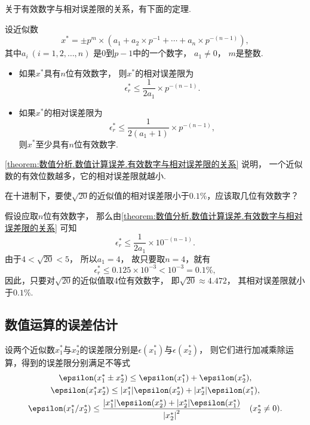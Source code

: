 关于有效数字与相对误差限的关系，有下面的定理.
\begin{theorem}\label{theorem:数值分析.数值计算误差.有效数字与相对误差限的关系}
设近似数\begin{equation*}
	x^*
	= \pm p^m \times (
		a_1
		+ a_2 \times p^{-1}
		+ \dotsb
		+ a_n \times p^{-(n-1)}
	),
\end{equation*}
其中\(a_i\ (i=1,2,\dotsc,n)\)
是\(0\)到\(p-1\)中的一个数字，
\(a_1\neq0\)，
\(m\)是整数.
\begin{itemize}
	\item 如果\(x^*\)具有\(n\)位有效数字，
	则\(x^*\)的相对误差限为\begin{equation}
		\epsilon^*_r
		\leq \frac1{2 a_1} \times p^{-(n-1)}.
	\end{equation}

	\item 如果\(x^*\)的相对误差限为\begin{equation*}
		\epsilon^*_r
		\leq \frac1{2(a_1+1)} \times p^{-(n-1)},
	\end{equation*}
	则\(x^*\)至少具有\(n\)位有效数字.
\end{itemize}
\end{theorem}
\cref{theorem:数值分析.数值计算误差.有效数字与相对误差限的关系} 说明，
一个近似数的有效位数越多，它的相对误差限就越小.

\begin{theorem}
在十进制下，要使\(\sqrt{20}\)的近似值的相对误差限小于\(0.1\%\)，应该取几位有效数字？
\begin{solution}
假设应取\(n\)位有效数字，
那么由\cref{theorem:数值分析.数值计算误差.有效数字与相对误差限的关系} 可知\begin{equation*}
	\epsilon^*_r \leq \frac1{2a_1} \times 10^{-(n-1)}.
\end{equation*}
由于\(4 < \sqrt{20} < 5\)，
所以\(a_1 = 4\)，
故只要取\(n = 4\)，就有\begin{equation*}
	\epsilon^*_r
	\leq 0.125 \times 10^{-3}
	< 10^{-3}
	= 0.1\%,
\end{equation*}
因此，只要对\(\sqrt{20}\)的近似值取4位有效数字，
即\(\sqrt{20} \approx 4.472\)，
其相对误差限就小于\(0.1\%\).
\end{solution}
\end{theorem}

\subsection{数值运算的误差估计}
设两个近似数\(x^*_1\)与\(x^*_2\)的误差限分别是\(\epsilon(x^*_1)\)与\(\epsilon(x^*_2)\)，
则它们进行加减乘除运算，得到的误差限分别满足不等式\begin{gather*}
	\epsilon(x^*_1 \pm x^*_2)
	\leq \epsilon(x^*_1) + \epsilon(x^*_2), \\
	\epsilon(x^*_1 x^*_2)
	\leq \abs{x^*_1} \epsilon(x^*_2) + \abs{x^*_2} \epsilon(x^*_1), \\
	\epsilon(x^*_1 / x^*_2)
	\leq \frac{\abs{x^*_1} \epsilon(x^*_2) + \abs{x^*_2} \epsilon(x^*_1)}{\abs{x^*_2}^2}
	\quad(x^*_2 \neq 0).
\end{gather*}

